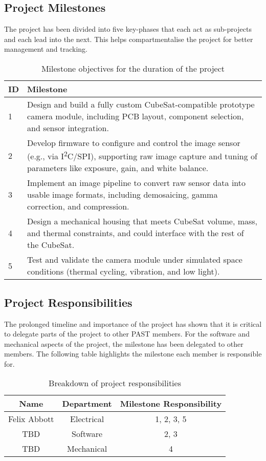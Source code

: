 \documentclass[10pt]{article}
\begin{document}
\subsection{Project Milestones}
The project has been divided into five key-phases that each act as sub-projects and each lead into the next. This helps compartmentalise the project for better management and tracking.
\begin{table}[H]
\centering
\begin{tabular}{|p{0.5cm}|p{12cm}|}
\hline
\textbf{ID} & \textbf{Milestone} \\
\hline
1 & Design and build a fully custom CubeSat-compatible prototype camera module, including PCB layout, component selection, and sensor integration. \\
\hline
2 & Develop firmware to configure and control the image sensor (e.g., via I\textsuperscript{2}C/SPI), supporting raw image capture and tuning of parameters like exposure, gain, and white balance. \\
\hline
3 & Implement an image pipeline to convert raw sensor data into usable image formats, including demosaicing, gamma correction, and compression. \\
\hline
4 & Design a mechanical housing that meets CubeSat volume, mass, and thermal constraints, and could interface with the rest of the CubeSat. \\
\hline
5 & Test and validate the camera module under simulated space conditions (thermal cycling, vibration, and low light). \\
\hline
\end{tabular}
\caption{Milestone objectives for the duration of the project}
\label{tab:milestones}
\end{table}


\subsection{Project Responsibilities}
The prolonged timeline and importance of the project has shown that it is critical to delegate parts of the project to other PAST members.
For the software and mechanical aspects of the project, the milestone has been delegated to other members. The following table highlights the milestone each member is responsible for.
\begin{table}[H]
\centering
\begin{tabular}{|c|c|c|}
\hline
\textbf{Name} & \textbf{Department} & \textbf{Milestone Responsibility} \\
\hline
Felix Abbott & Electrical & 1, 2, 3, 5 \\
\hline
TBD & Software & 2, 3 \\
\hline
TBD & Mechanical & 4 \\
\hline
\end{tabular}
\caption{Breakdown of project responsibilities}
\label{tab:responsibilities}
\end{table}
\end{document}
